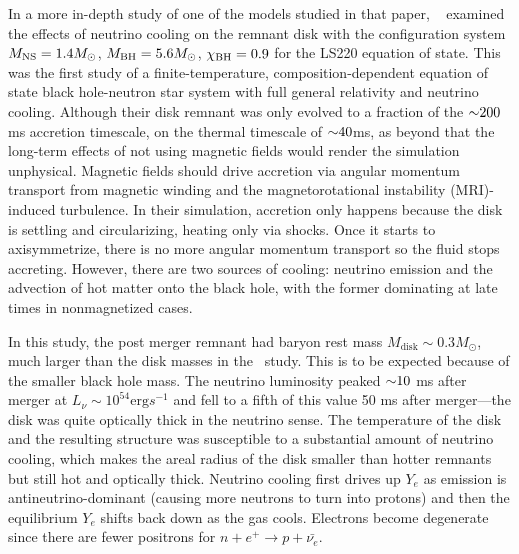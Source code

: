 In a more in-depth study of one of the models studied in that paper, ~\cite{Deaton2013} examined the effects of neutrino cooling on the remnant disk with the configuration system $M_{\rm NS} = 1.4 M_\odot$, $M_{\rm BH} = 5.6 M_\odot$, $\chi_{\rm BH} = 0.9$ for the LS220 equation of state.  
This was the first study of a finite-temperature, composition-dependent equation of state black hole-neutron star system with full general relativity and neutrino cooling.  
Although their disk remnant was only evolved to a fraction of the $\mathord{\sim} 200$ms accretion timescale, on the thermal timescale of $\mathord{\sim} 40$ms, as beyond that the long-term effects of not using magnetic fields would render the simulation unphysical.
Magnetic fields should drive accretion via angular momentum transport from magnetic winding and the magnetorotational instability (MRI)-induced turbulence.
In their simulation, accretion only happens because the disk is settling and circularizing, heating only via shocks.
Once it starts to axisymmetrize, there is no more angular momentum transport so the fluid stops accreting. 
However, there are two sources of cooling: neutrino emission and the advection of hot matter onto the black hole, with the former dominating at late times in nonmagnetized cases.

In this study, the post merger remnant had baryon rest mass $M_\textrm{disk} \sim 0.3 M_\odot$, much larger than the disk masses in the~\cite{Foucart:2014nda} study.  
This is to be expected because of the smaller black hole mass.
The neutrino luminosity peaked $\mathord{\sim} 10$ ms after merger at $L_\nu \sim 10^{54} \textrm{erg} s^{-1}$ and fell to a fifth of this value 50 ms after merger---the disk was quite optically thick in the neutrino sense.  
The temperature of the disk and the resulting structure was susceptible to a substantial amount of neutrino cooling, which makes the areal radius of the disk smaller than hotter remnants but still hot and optically thick.
Neutrino cooling first drives up $Y_e$ as emission is antineutrino-dominant (causing more neutrons to turn into protons)
and then the equilibrium $Y_e$ shifts back down as the gas cools.  
Electrons become degenerate since there are fewer positrons for $n + e^+ \rightarrow p + \bar{\nu_e}$.

